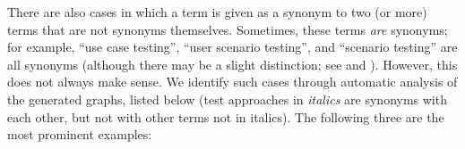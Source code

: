 \label{multiSyns}
There are also cases in which a term is given as a synonym to two (or more)
terms that are not synonyms themselves. Sometimes, these terms
\emph{are} synonyms; for example, \citetISTQB{} 
``use case testing'', ``user scenario testing'', and ``scenario testing'' are
all synonyms (although there may be a slight distinction; see
 and ).
%
%
%
%
However, this does not always make sense. We identify \multiSynCount{}
such cases through automatic analysis of the generated graphs\ifnotpaper,
listed below (test approaches in \emph{italics} are synonyms with each other,
but not with other terms not in italics)\else. The following three are the most prominent examples\fi:

\ifnotpaper\else\fi

\begin{enumerate}
    
\end{enumerate}

